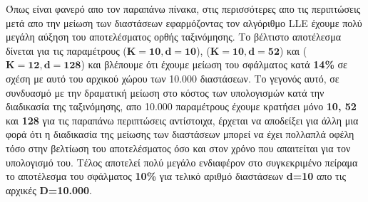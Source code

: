 \par
Όπως είναι φανερό απο τον παραπάνω πίνακα, στις περισσότερες απο τις περιπτώσεις μετά απο την μείωση των διαστάσεων εφαρμόζοντας τον αλγόριθμο \textlatin{LLE} έχουμε πολύ μεγάλη αύξηση του αποτελέσματος ορθής ταξινόμησης. Το βέλτιστο αποτέλεσμα δίνεται για τις παραμέτρους ($\mathbf{K=10, d=10}$), ($\mathbf{K=10,d=52}$) και ($\mathbf{K=12,d=128}$) και βλέπουμε ότι έχουμε μείωση του σφάλματος κατά \textbf{14\%} σε σχέση με αυτό του αρχικού χώρου των 10.000 διαστάσεων. Το γεγονός αυτό, σε συνδυασμό με την δραματική μείωση στο κόστος των υπολογισμών κατά την διαδικασία της ταξινόμησης, απο 10.000 παραμέτρους έχουμε κρατήσει μόνο \textbf{10, 52} και \textbf{128} για τις παραπάνω περιπτώσεις αντίστοιχα, έρχεται να αποδείξει για άλλη μια φορά ότι η διαδικασία της μείωσης των διαστάσεων μπορεί να έχει πολλαπλά οφέλη τόσο στην βελτίωση του αποτελέσματος όσο και στον χρόνο που απαιτείται για τον υπολογισμό του. Τέλος αποτελεί πολύ μεγάλο ενδιαφέρον στο συγκεκριμένο πείραμα το αποτέλεσμα του σφάλματος \textbf{10\%} για τελικό αριθμό διαστάσεων \textbf{\textlatin{d}=10} απο τις αρχικές \textbf{\textlatin{D}=10.000}.